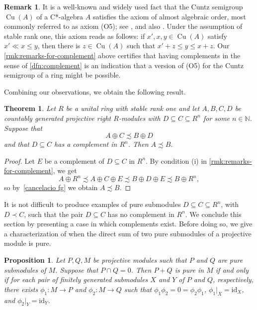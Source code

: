 \documentclass[11pt]{amsart}
\numberwithin{equation}{section}
\newtheorem{thm}[thmCt]{Theorem}
\newtheorem{prp}[prpCt]{Proposition}
\theoremstyle{definition}
\newtheorem{rmk}[rmkCt]{Remark}
\DeclareMathOperator{\Cu}{Cu}
\theoremstyle{plain}
\theoremstyle{definition}
\begin{document}
\begin{rmk}
It is a well-known and widely used fact that the Cuntz semigroup $\Cu(A)$ of a C*-algebra $A$ satisfies the axiom of almost algebraic order, most commonly referred to as axiom (O5); see \cite[Lemma 7.1]{RorWin10ZRevisited}, and also \cite[Proposition 4.6]{AntPerThi14arX:TensorProdCu}. Under the assumption of stable rank one, this axiom reads as follows: if $x',x,y\in \Cu(A)$ satisfy $x'\ll x\leq y$, then there is $z\in \Cu(A)$ such that $x'+z\leq y\leq x+z$. Our \autoref{rmk:remarks-for-complement} above certifies that having complements in the sense of \autoref{dfn:complement} is an indication that a version of (O5) for the Cuntz semigroup of a ring might be possible.
\end{rmk}

Combining our observations, we obtain the following result.

\begin{thm} \label{complement implica cancelacio}
Let $R$ be a unital ring with stable rank one and let $A,B,C,D$ be countably generated projective right $R$-modules with $D \subseteq C \subseteq R^n$ for some $n \in \mathbb{N}$. Suppose that
\begin{equation*}
    A \oplus C \precsim B \oplus D
\end{equation*}
and that $D \subseteq C$ has a complement in $R^n$. Then $A \precsim B$. 
\end{thm}

\begin{proof}
Let $E$ be a complement of $D \subseteq C$ in $R^n$. By condition (i) in \autoref{rmk:remarks-for-complement}, we get 
\begin{equation*}
A \oplus R^n \precsim A \oplus C \oplus E \precsim B \oplus D \oplus E \precsim B \oplus R^n,
\end{equation*}
so by~\autoref{cancelacio fg} we obtain $A \precsim B$. 
\end{proof}

It is not difficult to produce examples of pure submodules $D\subseteq C\subseteq R^n$, with $D\prec C$, such that the pair $D\subseteq C$ has no complement in $R^n$. We conclude this section by presenting a case in which complements exist. Before doing so, we give a characterization of when the direct sum of two pure submodules of a projective module is pure.

\begin{prp}
    \label{prp:sum-of-pures}
Let $P,Q,M$ be projective modules such that $P$ and $Q$ are pure submodules of $M$. Suppose that 
$P\cap Q= 0$. Then $P+Q$ is pure in $M$ if and only if for each pair of finitely generated submodules $X$ and $Y$ of $P$ and $Q$, respectively, there exists $\phi_1\colon M \to P$ and $\phi_2\colon M\to Q$ such that $\phi_1\phi_2 = 0=\phi_2\phi_1$,
$\phi_1|_X= \mathrm{id}_X$, and $\phi_2|_Y=\mathrm{id}_Y$.
    \end{prp}
\end{document}
